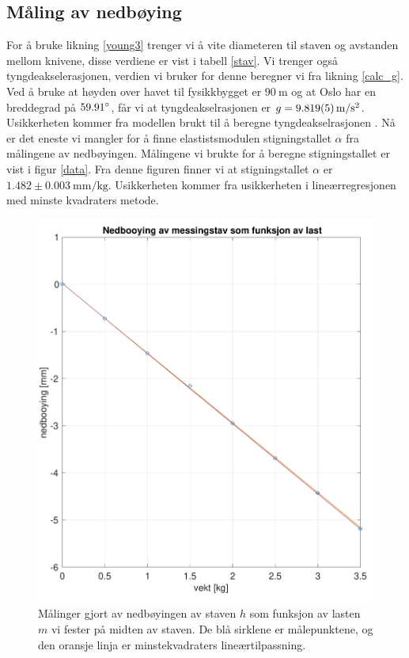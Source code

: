 \documentclass[%
 reprint,
 amsmath,amssymb,
 aps,
 norsk,
 booktabs
]{revtex4-1}
\begin{document}
\subsection{Måling av nedbøying}
For å bruke likning \eqref{young3} trenger vi å vite diameteren til staven og avstanden mellom knivene, disse verdiene er vist i tabell \vref{stav}. Vi trenger også tyngdeakselerasjonen, verdien vi bruker for denne beregner vi fra likning \eqref{calc_g}. Ved å bruke at høyden over havet til fysikkbygget er $\SI{90}{\meter}$ og at Oslo har en breddegrad på $59.91\degree$, får vi at tyngdeakselrasjonen er $g=\SI{9.819\pm0.005}{\meter\per\second^2}$. Usikkerheten kommer fra modellen brukt til å beregne tyngdeakselrasjonen \cite{gravity}.
Nå er det eneste vi mangler for å finne elastistsmodulen stigningstallet $\alpha$ fra målingene av nedbøyingen. Målingene vi brukte for å beregne stigningstallet er vist i figur \vref{data}. Fra denne figuren finner vi at stigningstallet $\alpha$ er $1.482\pm\SI{0.003}{\milli\meter\per\kilo\gram}$. Usikkerheten kommer fra usikkerheten i lineærregresjonen med minste kvadraters metode.
\begin{figure}[h!]
  \centering
  \includegraphics[scale=0.4]{nedbooying_c.pdf}
  \caption{Målinger gjort av nedbøyingen av staven $h$ som funksjon av lasten $m$ vi fester på midten av staven. De blå sirklene er målepunktene, og den oransje linja er minstekvadraters lineærtilpassning.}
  \label{data}
\end{figure}
\end{document}
